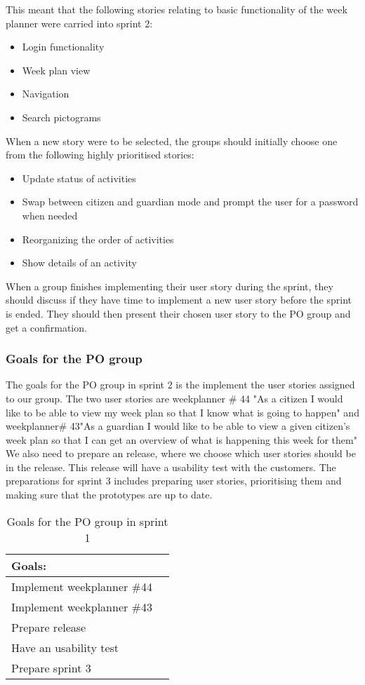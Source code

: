 This meant that the following stories relating to basic functionality of the week planner were carried into sprint 2:
\begin{itemize}
    \item Login functionality
    \item Week plan view
    \item Navigation
    \item Search pictograms
\end{itemize}
When a new story were to be selected, the groups should initially choose one from the following highly prioritised stories:
\begin{itemize}
    \item Update status of activities
    \item Swap between citizen and guardian mode and prompt the user for a password when needed
    \item Reorganizing the order of activities
    \item Show details of an activity
\end{itemize}
When a group finishes implementing their user story during the sprint, they should discuss if they have time to implement a new user story before the sprint is ended. They should then present their chosen user story to the PO group and get a confirmation.

\subsubsection{Goals for the PO group}
The goals for the PO group in sprint 2 is the implement the user stories assigned to our group.
The two user stories are weekplanner \# 44 "As a citizen I would like to be able to view my week plan so that I know what is going to happen" and weekplanner\# 43"As a guardian I would like to be able to view a given citizen's week plan so that I can get an overview of what is happening this week for them"
We also need to prepare an release, where we choose which user stories should be in the release.
This release will have a usability test with the customers.
The preparations for sprint 3 includes preparing user stories, prioritising them and making sure that the prototypes are up to date.
\begin{table}[H]
    \centering
    \begin{tabular}{|l|l|}
    \hline
    Goals:                                   \\ \hline
    Implement weekplanner \#44               \\ \hline
    Implement weekplanner \#43               \\ \hline
    Prepare release                          \\ \hline
    Have an usability test                   \\ \hline
    Prepare sprint 3                         \\ \hline
    \end{tabular}
    \caption{Goals for the PO group in sprint 1}
    \label{PO-goal-sprint-2-review}
\end{table}
